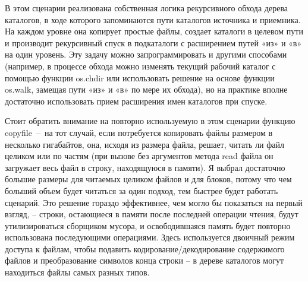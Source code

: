 \documentclass[12pt]{article}
\begin{document}
В этом сценарии реализована собственная логика рекурсивного обхода
дерева каталогов, в ходе которого запоминаются пути каталогов источника и приемника. На каждом уровне она копирует простые файлы,
создает каталоги в целевом пути и производит рекурсивный спуск в подкаталоги с расширением путей «из» и «в» на один уровень. Эту задачу
можно запрограммировать и другими способами (например, в процессе
обхода можно изменять текущий рабочий каталог с помощью функции
os.chdir или использовать решение на основе функции os.walk, замещая
пути «из» и «в» по мере их обхода), но на практике вполне достаточно
использовать прием расширения имен каталогов при спуске.

Стоит обратить внимание на повторно используемую в этом сценарии функцию \\ copyfile~–~на 
тот случай, если потребуется копировать файлы размером в несколько гигабайтов, она, исходя из размера файла, решает,
читать ли файл целиком или по частям (при вызове без
аргументов метода read файла он загружает весь файл в строку, находящуюся в памяти). Я выбрал достаточно большие размеры для читаемых целиком файлов и для блоков, потому что чем больший объем
будет читаться за один подход, тем быстрее будет работать сценарий.
Это решение гораздо эффективнее, чем могло бы показаться на первый
взгляд, – строки, остающиеся в памяти после последней операции чтения, будут утилизироваться сборщиком мусора, и освободившаяся память будет повторно использована последующими операциями. Здесь используется двоичный режим доступа к файлам, чтобы подавить кодирование/декодирование содержимого файлов и преобразование символов конца строки – в дереве каталогов могут находиться
файлы самых разных типов.
\end{document}
